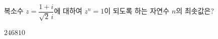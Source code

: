 복소수 $z=\dfrac{1+i}{\sqrt{2}\,i}$에 대하여 $z^n=1$이 되도록 하는 자연수 $n$의 최솟값은? 
\begin{choices32}{$2$}{$4$}{$6$}{$8$}{$10$}\end{choices32}
